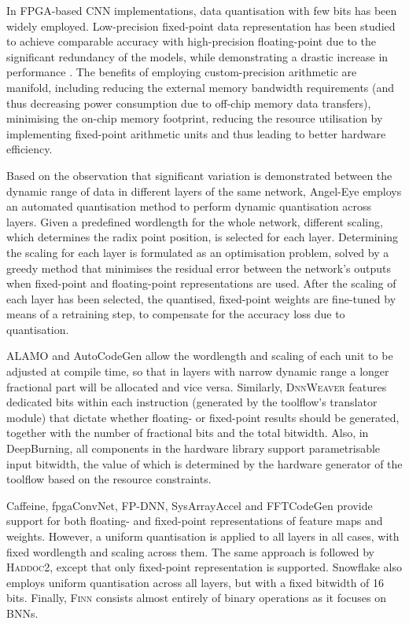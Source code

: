 \documentclass[format=acmsmall, review=false, screen=true]{acmart}
\begin{document}
In FPGA-based CNN implementations, data quantisation with few bits has been widely employed. Low-precision fixed-point data representation has been studied to achieve comparable accuracy with high-precision floating-point due to the significant redundancy of the models, while demonstrating a drastic increase in performance \cite{Suda_2016}. The benefits of employing custom-precision arithmetic are manifold, including reducing the external memory bandwidth requirements (and thus decreasing power consumption due to off-chip memory data transfers), minimising the on-chip memory footprint, reducing the resource utilisation by implementing fixed-point arithmetic units and thus leading to better hardware efficiency. 

Based on the observation that significant variation is demonstrated between the dynamic range of data in different layers of the same network, Angel-Eye {\color{black}employs an automated quantisation method to perform dynamic quantisation across layers.} Given a predefined wordlength for the whole network, different scaling, which determines the radix point position, is selected for each layer. Determining the scaling for each layer is formulated as an optimisation problem, solved by a greedy method that minimises the residual error between the network's outputs when fixed-point and floating-point representations are used. {\color{black}After the scaling of each layer has been selected, the quantised, fixed-point weights are fine-tuned by means of a retraining step, to compensate for the accuracy loss due to quantisation.}

ALAMO {\color{black}and AutoCodeGen} allow the wordlength and scaling of each unit to be adjusted at compile time, so that in layers with narrow dynamic range a longer fractional part will be allocated and vice versa. Similarly, \textsc{DnnWeaver} features dedicated bits within each instruction %
(generated by the toolflow's translator module) that dictate whether floating- or fixed-point results should be generated, together with the number of fractional bits and the total bitwidth. Also, in DeepBurning, all components in the hardware library support parametrisable input bitwidth, the value of which is determined by the hardware generator of the toolflow based on the resource constraints.


Caffeine, fpgaConvNet, FP-DNN, SysArrayAccel {\color{black} and FFTCodeGen} provide support for both floating- and fixed-point representations of feature maps and weights. However, a uniform quantisation is applied to all layers in all cases, with fixed wordlength and scaling across them. {\color{black}The same approach is followed by \textsc{Haddoc2}, except that only fixed-point representation is supported.} {\color{black}Snowflake also employs uniform quantisation across all layers, but with a fixed bitwidth of 16 bits.} Finally, \textsc{Finn} consists almost entirely of binary operations as it focuses on BNNs. 
\end{document}
